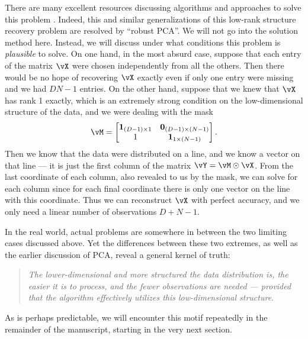 \documentclass[../../book-main.tex]{subfiles}
\begin{document}
There are many excellent resources discussing algorithms and approaches to solve this problem \cite{Wright-Ma-2022}. Indeed, this and similar generalizations of this low-rank structure recovery problem are resolved by ``robust PCA''. We will not go into the solution method here. Instead, we will discuss under what conditions this problem is \textit{plausible} to solve. On one hand, in the most absurd case, suppose that each entry of the matrix \(\vX\) were chosen independently from all the others. Then there would be no hope of recovering \(\vX\) exactly even if only one entry were missing and we had \(DN - 1\) entries. On the other hand, suppose that we knew that \(\vX\) has rank 1 exactly, which is an extremely strong condition on the low-dimensional structure of the data, and we were dealing with the mask
\begin{equation}
    \vM = \mat{\vone_{(D - 1) \times 1} & \vzero_{(D - 1) \times (N - 1)} \\ 1 & \vone_{1 \times (N - 1)} }.
\end{equation}
Then we know that the data were distributed on a line, and we know a vector on that line --- it is just the first column of the matrix \(\vY = \vM \odot \vX\). From the last coordinate of each column, also revealed to us by the mask, we can solve for each column since for each final coordinate there is only one vector on the line with this coordinate. Thus we can reconstruct \(\vX\) with perfect accuracy, and we only need a linear number of observations \(D + N - 1\). 

In the real world, actual problems are somewhere in between the two limiting cases discussed above. Yet the differences between these two extremes, as well as the earlier discussion of PCA, reveal a general kernel of truth:
\begin{quote}
    \centering
    \textit{The lower-dimensional and more structured the data distribution is, the easier it is to process, and the fewer observations are needed --- provided that the algorithm effectively utilizes this low-dimensional structure.}
\end{quote}
As is perhaps predictable, we will encounter this motif repeatedly in the remainder of the manuscript, starting in the very next section.
\end{document}
